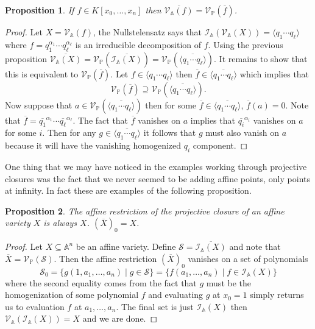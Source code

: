 \documentclass[40pt]{article}
\newcommand{\mcal}[1]{\mathcal{#1}}
\newcommand{\Proj}{\mathbb{P}}
\newcommand{\A}{\mathbb{A}}
\newcommand{\I}{\mathcal{I}}
\newcommand{\V}{\mathcal{V}}
\newcommand{\la}{\langle}
\newcommand{\ra}{\rangle}
\newtheorem{proposition}{Proposition}[section]
\theoremstyle{remark}
\begin{document}
		\begin{proposition}
			If $f \in K[x_0,\dots,x_n]$ then $\overline{\V_\A(f)} = \V_\Proj(\overline f)$. 
		\end{proposition}
		\begin{proof}
			Let $X = \V_\A(f)$, the Nullstelensatz says that $\I_\A(\V_\A(X)) = \la q_1\cdots q_\ell \ra$ where $f = q_1^{\alpha_1}\cdots q_\ell^{\alpha_\ell}$ is an irreducible decomposition of $f$. Using the previous proposition $\overline {\V_\A(X)} = \V_\Proj(\overline{\I_\A(X)}) = \V_\Proj(\overline{\la q_1\cdots q_\ell \ra})$. It remains to show that this is equivalent to $\V_\Proj(\overline f)$. Let $f \in \la q_1 \cdots q_\ell \ra$ then $\overline f \in \overline{\la q_1 \cdots q_\ell \ra}$ which implies that 
			\[
			\V_\Proj(\overline f) \supseteq \V_\Proj( \overline{\la q_1 \cdots q_\ell \ra}).
			\]
			Now suppose that $a \in \V_\Proj( \overline{\la q_1 \cdots q_\ell \ra})$ then for some $\overline f \in  \overline{\la q_1 \cdots q_\ell \ra}$, $\overline f (a) = 0$. Note that $\overline f = \overline{q_1}^{\alpha_1}\cdots\overline{q_\ell}^{\alpha_\ell}$. The fact that $\overline f$ vanishes on $a$ implies that $\overline{q_i}^{\alpha_i}$ vanishes on $a$ for some $i$. Then for any $g \in  \overline{\la q_1 \cdots q_\ell \ra}$ it follows that $g$ must also vanish on $a$ because it will have the vanishing homogenized $q_i$ component.
		\end{proof}
		One thing that we may have noticed in the examples working through projective closures was the fact that we never seemed to be adding affine points, only points at infinity. In fact these are examples of the following proposition.
		\begin{proposition}
			The affine restriction of the projective closure of an affine variety $X$ is always $X$. $(\overline X)_0 = X$. 
		\end{proposition}
		\begin{proof}
			Let $X \subseteq \A^n$ be an affine variety. Define $\mcal{S} = \overline{\I_\A(X)}$ and note that $\overline X = \V_\Proj(\mcal{S})$. Then the affine restriction $(\overline X)_0$ vanishes on a set of polynomials 
			\[
			\mcal{S}_0 = \{g(1,a_1,\dots,a_n) \; | \; g \in \mcal{S}\} = \{f(a_1, \dots,a_n) \; | \; f \in \I_\A(X)\}
			\]
			where the second equality comes from the fact that $g$ must be the homogenization of some polynomial $f$ and evaluating $g$ at $x_0 = 1$ simply returns us to evaluation $f$ at $a_1,\dots,a_n$. The final set is just $\I_\A(X)$ then $\V_\A(\I_\A(X)) = X$ and we are done. 
		\end{proof}
\end{document}
